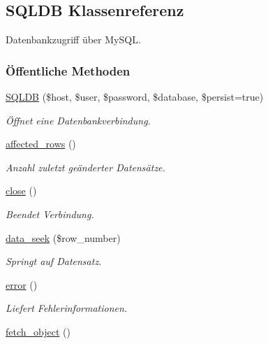 \hypertarget{classSQLDB}{
\subsection{SQLDB Klassenreferenz}
\label{classSQLDB}
}
Datenbankzugriff über My\-SQL.  


\subsubsection*{\"{O}ffentliche Methoden}
\begin{CompactItemize}
\item 
\hyperlink{classSQLDB_069ba0502ed4bfedb72768a03ff6854d}{SQLDB} (\$host, \$user, \$password, \$database, \$persist=true)
\begin{CompactList}\small\item\em Öffnet eine Datenbankverbindung. \item\end{CompactList}\item 
\hyperlink{classSQLDB_2d1ec94a4c94e4a505ec37f944363954}{affected\_\-rows} ()
\begin{CompactList}\small\item\em Anzahl zuletzt geänderter Datensätze. \item\end{CompactList}\item 
\hyperlink{classSQLDB_8c4f10efb418445877d7263412a082fa}{close} ()
\begin{CompactList}\small\item\em Beendet Verbindung. \item\end{CompactList}\item 
\hyperlink{classSQLDB_01346cc7c56480b57c76ca2dac515b2a}{data\_\-seek} (\$row\_\-number)
\begin{CompactList}\small\item\em Springt auf Datensatz. \item\end{CompactList}\item 
\hyperlink{classSQLDB_c889958653ffbf14922988e1dcbe014b}{error} ()
\begin{CompactList}\small\item\em Liefert Fehlerinformationen. \item\end{CompactList}\item 
\hyperlink{classSQLDB_43fa0105050768eba0ded5bd2f736709}{fetch\_\-object} ()

\end{CompactItemize}
